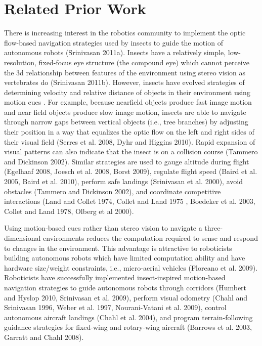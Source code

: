 \documentclass[12pt,letter]{article}
\begin{document}
\section{Related Prior Work} 

There is increasing interest in the robotics community to implement the optic flow-based navigation strategies used by insects to guide the motion of autonomous robots (Srinivasan 2011a). Insects have a relatively simple, low-resolution, fixed-focus eye structure (the compound eye) which cannot perceive the 3d relationship between features of the environment using stereo vision as vertebrates do (Srinivasan 2011b). However, insects have evolved strategies of determining velocity and relative distance of objects in their environment using motion cues . For example, because nearfield objects produce fast image motion and near field objects produce slow image motion, insects are able to navigate through narrow gaps between vertical objects (i.e., tree branches) by adjusting their position in a way that equalizes the optic flow on the left and right sides of their visual field (Serres et al. 2008, Dyhr and Higgins 2010). Rapid expansion of visual patterns can also indicate that the insect is on a collision course (Tammero and Dickinson 2002). Similar strategies are used to gauge altitude during flight (Egelhaaf 2008, Joesch et al. 2008, Borst 2009), regulate flight speed (Baird et al. 2005, Baird et al. 2010), perform safe landings (Srinivasan et al. 2000), avoid obstacles (Tammero and Dickinson 2002), and coordinate competitive interactions (Land and Collet 1974, Collet and Land 1975 , Boedeker et al. 2003, Collet and Land 1978, Olberg et al 2000). 

Using motion-based cues rather than stereo vision to navigate a three-dimensional environments reduces the computation required to sense and respond to changes in the environment. This advantage is attractive to roboticists building autonomous robots which have limited computation ability and have hardware size/weight constraints, i.e., micro-aerial vehicles (Floreano et al. 2009). Roboticists have successfully implemented insect-inspired motion-based navigation strategies to guide autonomous robots through corridors (Humbert and Hyslop 2010, Srinivasan et al. 2009), perform visual odometry (Chahl and Srinivasan 1996, Weber et al. 1997, Nourani-Vatani et al. 2009), control autonomous aircraft landings (Chahl et al. 2004), and program terrain-following guidance strategies for fixed-wing  and rotary-wing aircraft (Barrows et al. 2003,  Garratt and Chahl 2008). 
\end{document}
